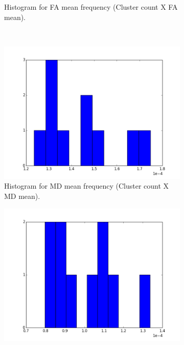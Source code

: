 \documentclass[a4paper,11pt]{report}
\begin{document}
\begin{figure}[!ht]
\begin{subfigure}[t]{.49\textwidth}
        \caption{Histogram for FA mean frequency (Cluster count X FA mean).}
        \label{subfig:fa_hist_fa}
      \end{subfigure}\hfill\\
      \begin{subfigure}[t]{.49\textwidth}
        \includegraphics[width=1\linewidth]{img/histograms/fa_clustered_fa_mask_md_means_hist.png}
        \caption{Histogram for MD mean frequency (Cluster count X MD mean).}
        \label{subfig:fa_hist_md}
      \end{subfigure}\hfill%
      \begin{subfigure}[t]{.49\textwidth}
        \includegraphics[width=1\linewidth]{img/histograms/fa_clustered_fa_mask_rd_means_hist.png}

\end{subfigure}
\end{figure}
\end{document}
